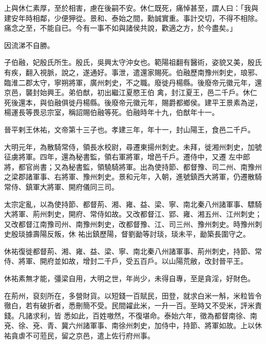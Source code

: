 \begin{pinyinscope}
 上與休仁素厚，至於相害，慮在後嗣不安。休仁既死，痛悼甚至，謂人曰：「我與
 建安年時相鄰，少便狎從。景和、泰始之間，勳誠實重。事計交切，不得不相除。痛念之至，不能自已。今有一事不如與諸侯共說，歡適之方，於今盡矣。」



 因流涕不自勝。



 子伯融，妃殷氏所生。殷氏，吳興太守沖女也。範陽祖翻有醫術，姿貌又美，殷氏有疾，翻入視脈，說之，遂通好。事泄，遣還家賜死。伯融歷南豫州刺史，琅邪、臨淮二郡太守，寧朔將軍，廣州刺史，不之職。廢徙丹楊縣。後廢帝元徽元年，還京邑，襲封始興王。弟伯猷，初出繼江夏愍王伯
 禽，封江夏王，邑二千戶。休仁死後還本，與伯融俱徙丹楊縣。後廢帝元徽元年，賜爵都鄉侯。建平王景素為逆，楊運長等畏忌宗室，稱詔賜伯融等死。伯融時年十九，伯猷年十一。



 晉平剌王休祐，文帝第十三子也。孝建三年，年十一，封山陽王，食邑二千戶。



 大明元年，為散騎常侍，領長水校尉，尋遷東揚州刺史。未拜，徙湘州刺史，加號征虜將軍。四年，還為秘書監，領右軍將軍，增邑千戶。遷侍中，又遷
 左中郎將，都官尚書；又為秘書監，領驍騎將軍。出為使持節、都督豫、司二州、南豫州之梁郡諸軍事、右將軍、豫州刺史。景和元年，入朝，進號鎮西大將軍，仍遷散騎常侍、鎮軍大將軍、開府儀同三司。



 太宗定亂，以為使持節、都督荊、湘、雍、益、梁、寧、南北秦八州諸軍事、驃騎大將軍、荊州刺史，開府、常侍如故。又改都督江、郢、雍、湘五州、江州刺史；又改都督江南豫司州、南豫州刺史，改都督豫、江、司三州、豫州刺史。時豫州刺史殷琰據壽陽反叛，休
 祐出鎮歷陽，督劉勔等討琰，琰未平，勔築長圍守之。



 休祐復徙都督荊、湘、雍、益、梁、寧、南北秦八州諸軍事、荊州刺史，持節、常侍、將軍、開府並如故，增封二千戶，受五百戶。以山陽荒敝，改封晉平王。



 休祐素無才能，彊梁自用，大明之世，年尚少，未得自專，至是貪淫，好財色。



 在荊州，裒刻所在，多營財貨。以短錢一百賦民，田登，就求白米一斛，米粒皆令徹白，若有破折者，悉刪簡不受。民間糴此米，一升一百。至時又不受米，評米責錢。凡諸求利，皆
 悉如此，百姓嗷然，不復堪命。泰始六年，徵為都督南徐、南兗、徐、兗、青、冀六州諸軍事、南徐州刺史，加侍中，持節、將軍如故。上以休祐貪虐不可蒞民，留之京邑，遣上佐行府州事。




\end{pinyinscope}
